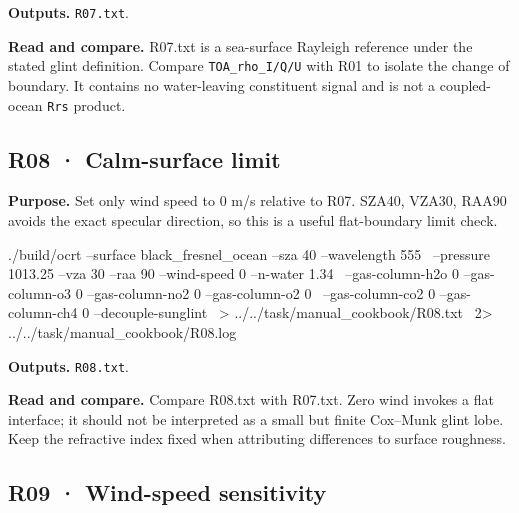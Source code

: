 \textbf{Outputs. }\texttt{R07.txt}.

\textbf{Read and compare. }R07.txt is a sea-surface Rayleigh reference under the stated glint definition. Compare \texttt{TOA\_\allowbreak{}rho\_\allowbreak{}I/\allowbreak{}Q/\allowbreak{}U} with R01 to isolate the change of boundary. It contains no water-leaving constituent signal and is not a coupled-ocean \texttt{Rrs} product.


\subsection{R08 · Calm-surface limit}
\label{sec:auto:09_cookbook:3.2}

\label{recipe:R08}

\textbf{Purpose. }Set only wind speed to 0 m/s relative to R07. SZA40\textdegree{}, VZA30\textdegree{}, RAA90\textdegree{} avoids the exact specular direction, so this is a useful flat-boundary limit check.

\noindent\begin{minipage}{\linewidth}
\begin{ManualCode}

./build/ocrt --surface black_fresnel_ocean --sza 40 --wavelength 555 \
  --pressure 1013.25 --vza 30 --raa 90 --wind-speed 0 --n-water 1.34 \
  --gas-column-h2o 0 --gas-column-o3 0 --gas-column-no2 0 --gas-column-o2 0 \
  --gas-column-co2 0 --gas-column-ch4 0 --decouple-sunglint \
  > ../../task/manual_cookbook/R08.txt \
  2> ../../task/manual_cookbook/R08.log

\end{ManualCode}
\end{minipage}\par

\textbf{Outputs. }\texttt{R08.txt}.

\textbf{Read and compare. }Compare R08.txt with R07.txt. Zero wind invokes a flat interface; it should not be interpreted as a small but finite Cox–Munk glint lobe. Keep the refractive index fixed when attributing differences to surface roughness.


\subsection{R09 · Wind-speed sensitivity}
\label{sec:auto:09_cookbook:3.3}

\label{recipe:R09}

